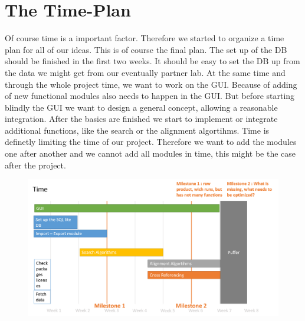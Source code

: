 \documentclass[]{article}
\begin{document}
\section{ The Time-Plan}
Of course time is a important factor. Therefore we started to organize a time plan for all of our ideas. This is of course the final plan. The set up of the DB should be finished in the first two weeks. It should be easy to set the DB up from the data we might get from our eventually partner lab. At the same time and through the whole project time, we want to work on the GUI. Because of adding of new functional modules also needs to happen in the GUI. But before starting blindly the GUI we want to design a general concept, allowing a reasonable integration. After the basics are finished we start to implement or integrate additional functions, like the search or the alignment algortihms. Time is definetly limiting the time of our project. Therefore we want to add the modules one after another and we cannot add all modules in time, this might be the case after the project.
  
	\begin{figure}[h]
		\includegraphics[scale=0.5]{img/Time.png}
	\end{figure}
\end{document}
